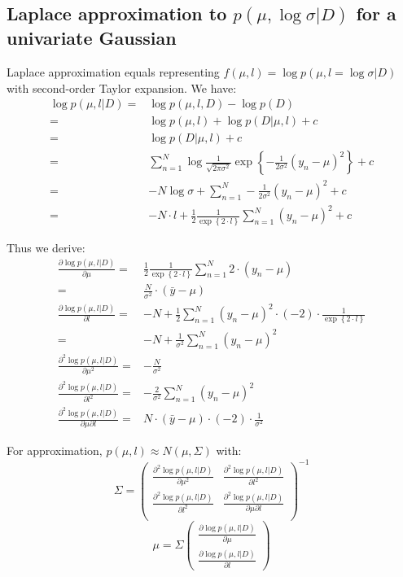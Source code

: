 \documentclass[UTF8]{ctexart}
\begin{document}
\subsection{Laplace approximation to $p(\mu,\log \sigma|D)$ for a univariate Gaussian}
Laplace approximation equals representing $f(\mu,l)=\log p(\mu,l=\log \sigma|D)$ with second-order Taylor expansion. We have:
\begin{align}
\log p(\mu,l|D)=&\log p(\mu,l,D)-\log p(D)\nonumber \\
=&\log p(\mu,l) + \log p(D|\mu,l) + c \nonumber \\
=&\log p(D|\mu,l) + c \nonumber \\
=&\sum_{n=1}^{N}\log \frac{1}{\sqrt{2\pi\sigma^{2}}}\exp\left\{-\frac{1}{2\sigma^{2}}(y_{n}-\mu)^{2}  \right\}+c \nonumber \\
=&-N\log \sigma+\sum_{n=1}^{N}-\frac{1}{2\sigma^{2}}(y_{n}-\mu)^{2}+c\nonumber \\
=&-N\cdot l+\frac{1}{2}\frac{1}{\exp\left\{2\cdot l\right\}}\sum_{n=1}^{N}(y_{n}-\mu)^{2}+c \nonumber
\end{align}

Thus we derive:
\begin{align}
\frac{\partial \log p(\mu,l|D)}{\partial \mu}=&\frac{1}{2}\frac{1}{\exp\left\{2\cdot l\right\}}\sum_{n=1}^{N}2\cdot (y_{n}-\mu) \nonumber \\
=&\frac{N}{\sigma^{2}}\cdot (\bar{y}-\mu)\nonumber \\ 
\frac{\partial \log p(\mu,l|D)}{\partial l}=&-N + \frac{1}{2}\sum_{n=1}^{N}(y_{n}-\mu)^{2}\cdot (-2)\cdot \frac{1}{\exp\left\{2\cdot l  \right\}} \nonumber \\
=&-N+\frac{1}{\sigma^{2}}\sum_{n=1}^{N}(y_{n}-\mu)^{2} \nonumber \\
\frac{\partial^{2} \log p(\mu,l|D)}{\partial \mu^{2}}=&-\frac{N}{\sigma^{2}} \nonumber \\
\frac{\partial^{2} \log p(\mu,l|D)}{\partial l^{2}}=&-\frac{2}{\sigma^{2}}\sum_{n=1}^{N}(y_{n}-\mu)^{2} \nonumber \\
\frac{\partial^{2} \log p(\mu,l|D)}{\partial \mu \partial l}=&N\cdot (\bar{y}-\mu)\cdot (-2) \cdot \frac{1}{\sigma^{2}} \nonumber 
\end{align}

For approximation, $p(\mu,l) \approx N(\mu, \Sigma)$ with:
$$\Sigma = \begin{pmatrix} \frac{\partial^{2} \log p(\mu,l|D)}{\partial \mu^{2}} & \frac{\partial^{2} \log p(\mu,l|D)}{\partial l^{2}} \\ \frac{\partial^{2} \log p(\mu,l|D)}{\partial l^{2}} &  \frac{\partial^{2} \log p(\mu,l|D)}{\partial \mu \partial l} \\ \end{pmatrix}^{-1}$$
$$\mu = \Sigma \begin{pmatrix} \frac{\partial \log p(\mu,l|D)}{\partial \mu} \\ \frac{\partial \log p(\mu,l|D)}{\partial l}  \end{pmatrix}$$
\end{document}
